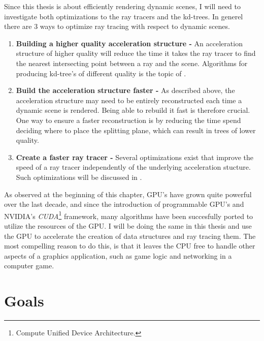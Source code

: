 Since this thesis is about efficiently rendering dynamic scenes, I will need to
investigate both optimizations to the ray tracers and the kd-trees. In generel
there are 3 ways to optimize ray tracing with respect to dynamic scenes.

\begin{enumerate}
  \item \textbf{Building a higher quality acceleration structure -} An
    acceleration structure of higher quality will reduce the time it takes the
    ray tracer to find the nearest intersecting point between a ray and the
    scene. Algorithms for producing kd-tree's of different quality is the topic
    of .
  \item \textbf{Build the acceleration structure faster -} As described above,
    the acceleration structure may need to be entirely reconstructed each time a
    dynamic scene is rendered. Being able to rebuild it fast is therefore
    crucial. One way to ensure a faster reconstruction is by reducing the time
    spend deciding where to place the splitting plane, which can result in trees
    of lower quality.
  \item \textbf{Create a faster ray tracer -} Several optimizations exist that
    improve the speed of a ray tracer independently of the underlying
    acceleration stucture. Such optimizations will be discussed in
    .
\end{enumerate}



As observed at the beginning of this chapter, GPU's have grown quite powerful
over the last decade, and since the introduction of programmable GPU's and
NVIDIA's \textit{CUDA}\footnote{Compute Unified Device Architecture.}
framework, many algorithms have been succesfully ported to utilize the resources
of the GPU. I will be doing the same in this thesis and use the GPU to
accelerate the creation of data structures and ray tracing them. The most
compelling reason to do this, is that it leaves the CPU free to handle other
aspects of a graphics application, such as game logic and networking in a
computer game.



\section{Goals}

